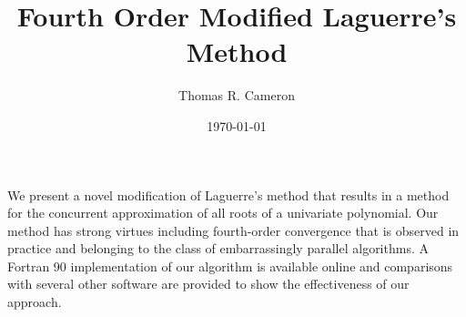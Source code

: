 \documentclass[20 pt, a0paper, portrait]{tikzposter}
\title{Fourth Order Modified Laguerre's Method}
\author{Thomas R. Cameron}
\date{\today}
\institute{Davidson College}
\begin{document}
 
\maketitle

{
We present a novel modification of Laguerre's method that results in a method for the concurrent approximation of all roots of a univariate polynomial. Our method has strong virtues including fourth-order convergence that is observed in practice and belonging to the class of embarrassingly parallel algorithms. A Fortran 90 implementation of our algorithm is available online and comparisons with several other software are provided to show the effectiveness of our approach.
}

\end{document}
